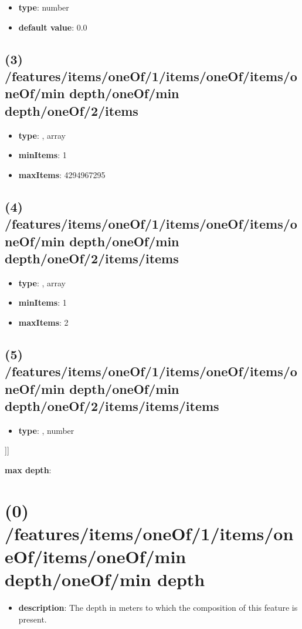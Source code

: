 \begin{itemize}[leftmargin=4em]\item {\bf type}: number\item {\bf default value}: 0.0
\end{itemize}\subsection{(3) /features/items/oneOf/1/items/oneOf/items/oneOf/min depth/oneOf/min depth/oneOf/2/items}
\begin{itemize}[leftmargin=3em]\item {\bf type}: , array\item {\bf minItems}: 1
\item {\bf maxItems}: 4294967295
\end{itemize}\subsection{(4) /features/items/oneOf/1/items/oneOf/items/oneOf/min depth/oneOf/min depth/oneOf/2/items/items}
\begin{itemize}[leftmargin=4em]\item {\bf type}: , array\item {\bf minItems}: 1
\item {\bf maxItems}: 2
\end{itemize}\subsection{(5) /features/items/oneOf/1/items/oneOf/items/oneOf/min depth/oneOf/min depth/oneOf/2/items/items/items}
\begin{itemize}[leftmargin=5em]\item {\bf type}: , number\end{itemize}]]\item {\bf max depth}: \section{(0) /features/items/oneOf/1/items/oneOf/items/oneOf/min depth/oneOf/min depth}
\begin{itemize}[leftmargin=0em]\item {\bf description}: The depth in meters to which the composition of this feature is present.
\end{itemize}
